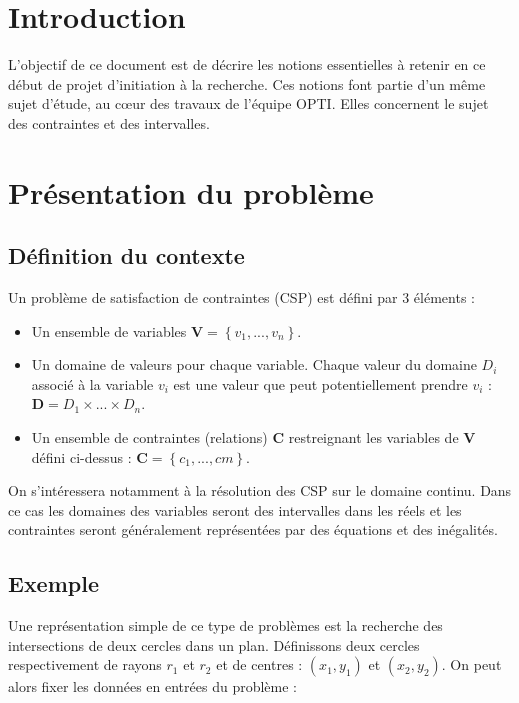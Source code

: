 \section{Introduction }
L'objectif de ce document est de décrire les notions essentielles à retenir en ce début de projet d'initiation à la recherche. Ces notions font partie d'un même sujet d'étude, au cœur des travaux de l'équipe \textsc{OPTI}. Elles concernent le sujet des contraintes et des intervalles. %

\section{Présentation du problème}
\subsection{Définition du contexte}
Un problème de satisfaction de contraintes (\textsc{CSP}) est défini par 3 éléments : 
\begin{itemize}
\item
Un ensemble de variables $\mathbf{V} = \left\{ v_1,...,v_n \right\}$.
\item
Un domaine de valeurs pour chaque variable. Chaque valeur du domaine $D_i$ associé à la variable $v_i$ est une valeur que peut potentiellement prendre $v_i$ : $\mathbf{D} = D_1 \times ... \times D_n $.
\item
Un ensemble de contraintes (relations) $\mathbf{C}$ restreignant les variables de $\mathbf{V}$ défini ci-dessus :  $\mathbf{C} = \left\{c_1,...,cm\right\}$. 
\end{itemize}

On s'intéressera notamment à la résolution des \textsc{CSP} sur le domaine continu. Dans ce cas les domaines des variables seront des intervalles dans les réels et les contraintes seront généralement représentées par des équations et des inégalités. 

\subsection{Exemple}

Une représentation simple de ce type de problèmes est la recherche des intersections de deux cercles dans un plan. Définissons deux cercles respectivement de rayons  $r_1$ et $r_2$ et de centres : $(x_1,y_1)$ et $(x_2,y_2)$.
On peut alors fixer les données en entrées du problème :


